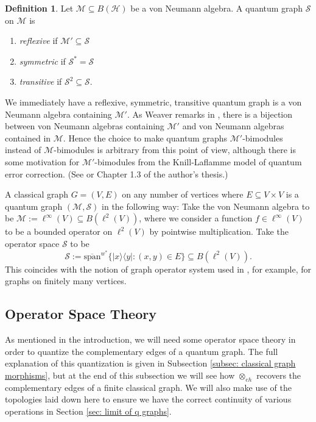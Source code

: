 \documentclass[12pt]{article}
\theoremstyle{definition}
\newtheorem{definition}[theorem]{Definition}
\newenvironment{remark}
  {\pushQED{\qed}\renewcommand{\qedsymbol}{\textcircled{\tiny R}}\remarkx}
  {\popQED\endremarkx}
\newenvironment{example}
  {\pushQED{\qed}\renewcommand{\qedsymbol}{\textcircled{\tiny E}}\examplex}
  {\popQED\endexamplex}
\newcommand{\Span}{\text{span}}
\newcommand{\mc}[1]{\mathcal{#1}}
\newcommand{\<}{\langle}
\renewcommand{\>}{\rangle}
\renewcommand{\subset}{\subseteq}
\newcommand{\eh}{\otimes_{eh}}
\begin{document}
\begin{definition}  \label{defn: qgraph properties}
    Let $\mc M \subset B(\mc H)$ be a von Neumann algebra. A quantum graph $\mc S$ on $\mc M$ is
    \begin{enumerate}
        \item \textit{reflexive} if $\mc M' \subset \mc S$
        \item \textit{symmetric} if $\mc S^* = \mc S$
        \item \textit{transitive} if $\mc S^2 \subset \mc S$.
    \end{enumerate}
\end{definition}

\begin{remark}
We immediately have a reflexive, symmetric, transitive quantum graph is a von Neumann algebra containing $\mc M'$. As Weaver remarks in \cite[Definition 2.6]{weaverqrelations}, there is a bijection between von  Neumann algebras containing $\mc M'$ and von Neumann algebras contained in $\mc M$. Hence the choice to make quantum graphs $\mc M'$-bimodules instead of $\mc M$-bimodules is arbitrary from this point of view, although there is some motivation for $\mc M'$-bimodules from the Knill-Laflamme model of quantum error correction. (See \cite[``Subsystems'']{klv} or Chapter 1.3 of the author's thesis.)
\end{remark}


\begin{example} \label{ex: classical-to-quantum-graph}
    A classical graph $G = (V,E)$ on any number of vertices where $E \subset V \times V$ is a quantum graph $(\mc M, \mc S)$ in the following way: Take the von Neumann algebra to be $\mc M := \ell^\infty(V) \subset B(\ell^2(V))$, where we consider a function $f \in \ell^\infty(V)$ to be a bounded operator on $\ell^2(V)$ by pointwise multiplication. Take the operator space $\mc S$ to be
    \[
    \mc S := \overline{\Span}^{w^*} \{|x\>\<y|: (x,y) \in E\} \subseteq B(\ell^2(V)).
    \]
    This coincides with the notion of graph operator system used in \cite{ortpaul}, for example, for graphs on finitely many vertices.
\end{example}

\subsection{Operator Space Theory} \label{subsec: opsp}
As mentioned in the introduction, we will need some operator space theory in order to quantize the complementary edges of a quantum graph. The full explanation of this quantization is given in Subsection \ref{subsec: classical graph morphisms}, but at the end of this subsection we will see how $\eh$ recovers the complementary edges of a finite classical graph. We will also make use of the topologies laid down here to ensure we have the correct continuity of various operations in Section \ref{sec: limit of q graphs}.
\end{document}
